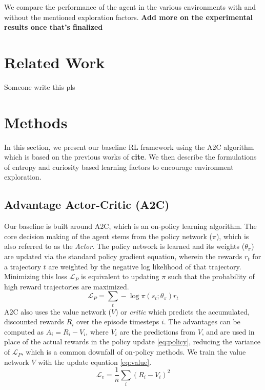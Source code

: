 \documentclass{article}
\begin{document}
We compare the performance of the agent in the various environments with and without the mentioned exploration factors. \textbf{Add more on the experimental results once that's finalized}

\section{Related Work}
Someone write this pls

\section{Methods}
In this section, we present our baseline RL framework using the A2C algorithm which is based on the previous works of \textbf{cite}. We then describe the formulations of entropy and curiosity based learning factors to encourage environment exploration.

\subsection{Advantage Actor-Critic (A2C)}
Our baseline is built around A2C, which is an on-policy learning algorithm. The core decision making of the agent stems from the policy network ($\pi$), which is also referred to as the \textit{Actor}. The policy network is learned and its weights ($\theta_\pi$) are updated via the standard policy gradient equation, wherein the rewards $r_t$ for a trajectory $t$ are weighted by the negative log likelihood of that trajectory. Minimizing this loss $\mathcal{L}_P$ is equivalent to updating $\pi$ such that the probability of high reward trajectories are maximized.
\begin{equation}\label{eq:policy}
\mathcal{L}_{P} = \sum_{t} -\log\pi(s_t; \theta_\pi) r_t
\end{equation}
A2C also uses the value network ($V$) or \textit{critic} which predicts the accumulated, discounted rewards $R_i$ over the episode timesteps $i$. The advantages can be computed as $A_i = R_i - V_i$, where $V_i$ are the predictions from $V$, and are used in place of the actual rewards in the policy update \ref{eq:policy}, reducing the variance of $\mathcal{L}_P$, which is a common downfall of on-policy methods. We train the value network $V$ with the update equation \ref{eq:value}.
\begin{equation}\label{eq:value}
\mathcal{L}_v = \frac{1}{n}\sum_i (R_i - V_i)^2
\end{equation}
\end{document}
